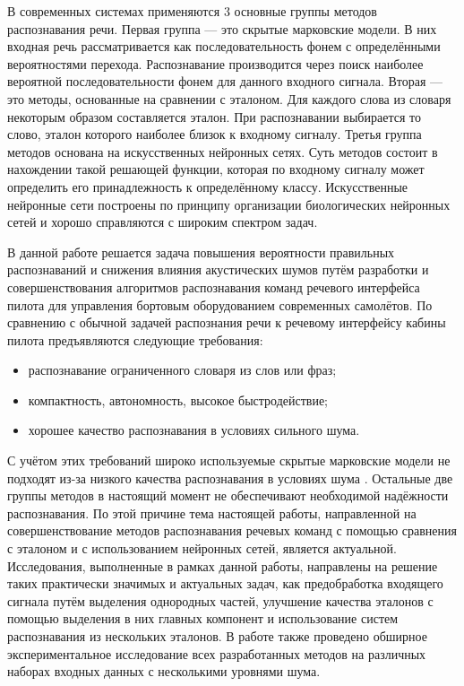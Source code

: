 В современных системах применяются 3 основные группы методов распознавания речи.
Первая группа --- это скрытые марковские модели.
В них входная речь рассматривается как последовательность фонем с определёнными вероятностями перехода.
Распознавание производится через поиск наиболее вероятной последовательности фонем для данного входного сигнала.
Вторая --- это методы, основанные на сравнении с эталоном.
Для каждого слова из словаря некоторым образом составляется эталон.
При распознавании выбирается то слово, эталон которого наиболее близок к входному сигналу.
Третья группа методов основана на искусственных нейронных сетях.
Суть методов состоит в нахождении такой решающей функции, которая по входному сигналу может определить его принадлежность к определённому классу.
Искусственные нейронные сети построены по принципу организации биологических нейронных сетей и хорошо справляются с широким спектром задач.

В данной работе решается задача повышения вероятности правильных распознаваний и снижения влияния акустических шумов путём разработки и совершенствования алгоритмов распознавания команд речевого интерфейса пилота для управления бортовым оборудованием современных самолётов.
По сравнению с обычной задачей распознания речи к речевому интерфейсу кабины пилота предъявляются следующие требования:

\begin{itemize}
	\item распознавание ограниченного словаря из слов или фраз;
	\item компактность, автономность, высокое быстродействие;
	\item хорошее качество распознавания в условиях сильного шума.
\end{itemize}

С учётом этих требований широко используемые скрытые марковские модели не подходят из-за низкого качества распознавания в условиях шума \cite{korsun2013experimental}.
Остальные две группы методов в настоящий момент не обеспечивают необходимой надёжности распознавания.
По этой причине тема настоящей работы, направленной на совершенствование методов распознавания речевых команд с помощью сравнения с эталоном и с использованием нейронных сетей, является актуальной.
Исследования, выполненные в рамках данной работы, направлены на решение таких практически значимых и актуальных задач, как предобработка входящего сигнала путём выделения однородных частей, улучшение качества эталонов с помощью выделения в них главных компонент и использование систем распознавания из нескольких эталонов.
В работе также проведено обширное экспериментальное исследование всех разработанных методов на различных наборах входных данных с несколькими уровнями шума.

